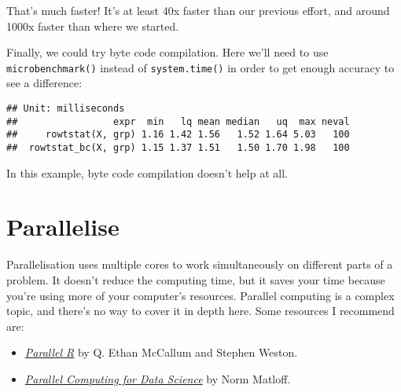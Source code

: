 \begin{Shaded}
\begin{Highlighting}[]
\NormalTok{(}
\end{Highlighting}
\end{Shaded}

That's much faster! It's at least 40x faster than our previous effort,
and around 1000x faster than where we started.

Finally, we could try byte code compilation. Here we'll need to use
\texttt{microbenchmark()} instead of \texttt{system.time()} in order to
get enough accuracy to see a difference:

\begin{Shaded}
\begin{Highlighting}[]
\StringTok{ }\OperatorTok{::}

\NormalTok{(}
   
\NormalTok{)}
\end{Highlighting}
\end{Shaded}

\begin{verbatim}
## Unit: milliseconds
##                 expr  min   lq mean median   uq  max neval
##     rowtstat(X, grp) 1.16 1.42 1.56   1.52 1.64 5.03   100
##  rowtstat_bc(X, grp) 1.15 1.37 1.51   1.50 1.70 1.98   100
\end{verbatim}

In this example, byte code compilation doesn't help at all.

\hypertarget{parallelise}{%
\section{Parallelise}\label{parallelise}}

Parallelisation uses multiple cores to work simultaneously on different
parts of a problem. It doesn't reduce the computing time, but it saves
your time because you're using more of your computer's resources.
Parallel computing is a complex topic, and there's no way to cover it in
depth here. Some resources I recommend are: 

\begin{itemize}
\item
  \href{http://amzn.com/B005Z29QT4}{\emph{Parallel R}} by Q. Ethan
  McCallum and Stephen Weston.
\item
  \href{http://amzn.com/1466587016}{\emph{Parallel Computing for Data
  Science}} by Norm Matloff.
\end{itemize}

